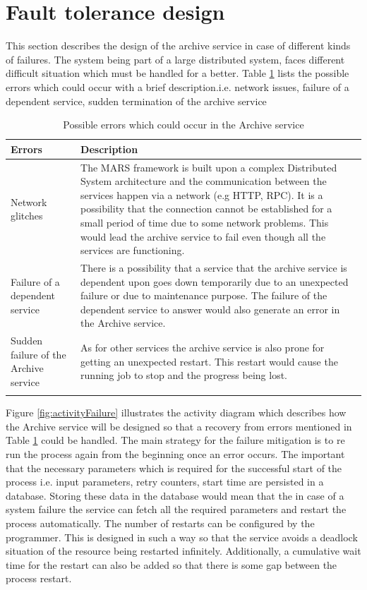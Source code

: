 \section{Fault tolerance design}
This section describes the design of the archive service in case of different kinds of failures. The system being part of a large distributed system,
faces different difficult situation which must be handled for a better. Table \ref{table:probServices} lists the possible errors which 
could occur with a brief description.i.e. network issues, failure of a 
dependent service, sudden termination of the archive service 
\begin{longtable}{|p{4cm}|p{10cm}|}
    \hline
        \textbf{Errors}  & \textbf{Description}\\
    \hline
        Network glitches & The MARS framework is built upon a complex Distributed System architecture and the communication between the services
        happen via a network (e.g HTTP, RPC). It is a possibility that the connection cannot be established for a small period of time due to some network problems.
        This would lead the archive service to fail even though all the services are functioning.\\
    \hline
        Failure of a dependent service & There is a possibility that a service that the archive service is dependent upon goes down temporarily due to an unexpected
        failure or due to maintenance purpose. The failure of the dependent service to answer would also generate an error in the Archive service.\\
    \hline
        Sudden failure of the Archive service & As for other services the archive service is also prone for getting an unexpected restart. This restart would cause
        the running job to stop and the progress being lost.\\    
    \hline
    \caption{Possible errors which could occur in the Archive service}
    \label{table:probServices} 
\end{longtable}

Figure \ref{fig:activityFailure} illustrates the activity diagram which describes how the Archive service will be designed so that a recovery from errors mentioned in
Table \ref{table:probServices} could be handled. The main strategy for the failure mitigation is to re run the process again from the beginning once an error occurs. 
The important that the necessary parameters which is required for the successful start of the process i.e. input parameters, retry counters, start time are persisted
in a database. Storing these data in the database would mean that the in case of a system failure the service can fetch all the required parameters and restart the 
process automatically. The number of restarts can be configured by the programmer. This is designed in such a way so that the service avoids a deadlock situation of the
resource being restarted infinitely. Additionally, a cumulative wait time for the restart can also be added so that there is some gap between the process restart.

